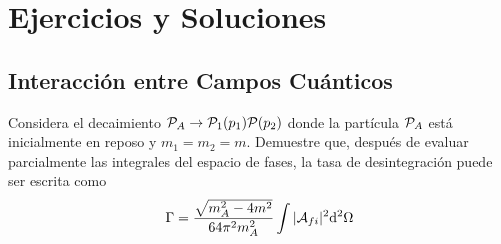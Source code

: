 
\chapter{Ejercicios y Soluciones}


\section{Interacción entre Campos Cuánticos}

\begin{ejercicio} 
	Considera el decaimiento $\mathcal{P}_A \rightarrow \mathcal{P}_1 (p_1) \mathcal{P} (p_2)$ donde la partícula $\mathcal{P}_A$ está inicialmente en reposo y $m_1=m_2=m$. Demuestre que, después de evaluar parcialmente las integrales del espacio de fases, la tasa de desintegración puede ser escrita como 
	\begin{equation}
		\Gamma = \frac{\sqrt{m_A^2 - 4 m^2}}{64\pi^2 m_A^2} \int |\mathcal{A}_{fi}|^2 \mathrm{d}^2 \Omega
	\end{equation}
\end{ejercicio}
